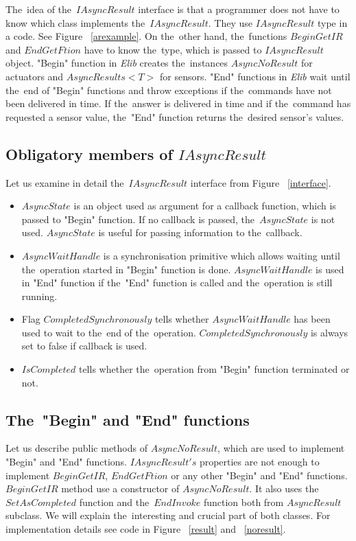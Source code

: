   
  The~idea of the~$IAsyncResult$ interface is that a programmer does not have to know which
  class implements the~$IAsyncResult$. They use $IAsyncResult$ type in a code. See Figure ~\ref{arexample}. 
  On the~other hand, the~functions $BeginGetIR$ and $EndGetFtion$ have to know the~type, which is passed to $IAsyncResult$ object.
  "Begin" function in {\it Elib} creates the~instances $AsyncNoResult$ for actuators and $AsyncResults<T>$ for sensors.
  "End" functions in {\it Elib} wait until the~end of "Begin" functions and 
  throw exceptions if the~commands have not been delivered in time.
  If the~answer is delivered in time and if the~command has requested a sensor value, 
  the~"End" function returns the~desired sensor's values.
  
\subsection*{Obligatory members of $IAsyncResult$} \label{sec:iasyncmemb}
  Let us examine in detail the~$IAsyncResult$ interface from Figure ~\ref{interface}. 
  \begin{itemize}
  \item $AsyncState$ is an object used as argument for a callback function, which
  is passed to "Begin" function. If no callback is passed, the~$AsyncState$ is not used. 
  $AsyncState$ is useful for passing information to the~callback.
  \item $AsyncWaitHandle$ is a synchronisation primitive which allows waiting until the~operation 
  started in "Begin" function is done.
  $AsyncWaitHandle$ is used in "End" function if the~"End" function is called 
  and the~operation is still running. 
  \item Flag $CompletedSynchronously$ tells whether  
  $AsyncWaitHandle$ has been used to wait to the~end of the~operation.
  $CompletedSynchronously$ is always set to false if callback is used.
  \item $IsCompleted$ tells whether the~operation from "Begin" function terminated or not.
  \end{itemize}

\subsection*{The~"Begin" and "End" functions} \label{sec:beginend}
  Let us describe public methods of $AsyncNoResult$, 
  which are used to implement "Begin" and "End" functions.
  $IAsyncResult's$ properties are not enough to implement $BeginGetIR$,
  $EndGetFtion$ or any other "Begin" and "End" functions.
  $BeginGetIR$ method use a constructor of $AsyncNoResult$. 
  It also uses the~$SetAsCompleted$ function 
  and the~$EndInvoke$ function both from $AsyncResult$ subclass.
  We will explain the~interesting and crucial part of both classes. 
  For implementation details see code in Figure ~\ref{result} and ~\ref{noresult}.
  
